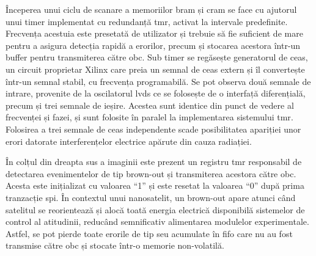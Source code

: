 \documentclass[12pt,a4paper]{report}
\begin{document}
Începerea unui ciclu de scanare a memoriilor \gls{bram} și \gls{cram} se face cu ajutorul unui timer implementat cu redundanță \gls{tmr}, activat la intervale predefinite. Frecvența acestuia este presetată de utilizator și trebuie să fie suficient de mare pentru a asigura detecția rapidă a erorilor, precum și stocarea acestora într-un buffer pentru transmiterea către \gls{obc}. Sub timer se regăsește generatorul de ceas, un circuit proprietar Xilinx care preia un semnal de ceas extern și îl convertește într-un semnal stabil, cu frecvența programabilă. Se pot observa două semnale de intrare, provenite de la oscilatorul \gls{lvds} ce se folosește de o interfață diferențială, precum și trei semnale de ieșire. Acestea sunt identice din punct de vedere al frecvenței și fazei, și sunt folosite în paralel la implementarea sistemului \gls{tmr}. Folosirea a trei semnale de ceas independente scade posibilitatea apariției unor erori datorate interferențelor electrice apărute din cauza radiației.

În colțul din dreapta sus a imaginii este prezent un registru \gls{tmr} responsabil de detectarea evenimentelor de tip brown-out și transmiterea acestora către \gls{obc}. Acesta este inițializat cu valoarea \enquote{1} și este resetat la valoarea \enquote{0} după prima tranzacție 
\gls{spi}. În contextul unui nanosatelit, un brown-out apare atunci când satelitul se reorientează și alocă toată energia electrică disponibilă sistemelor de control al atitudinii, reducând semnificativ alimentarea modulelor experimentale. Astfel, se pot pierde toate erorile de tip \gls{seu} acumulate în \gls{fifo} care nu au fost transmise către \gls{obc} și stocate într-o memorie non-volatilă.
\end{document}
